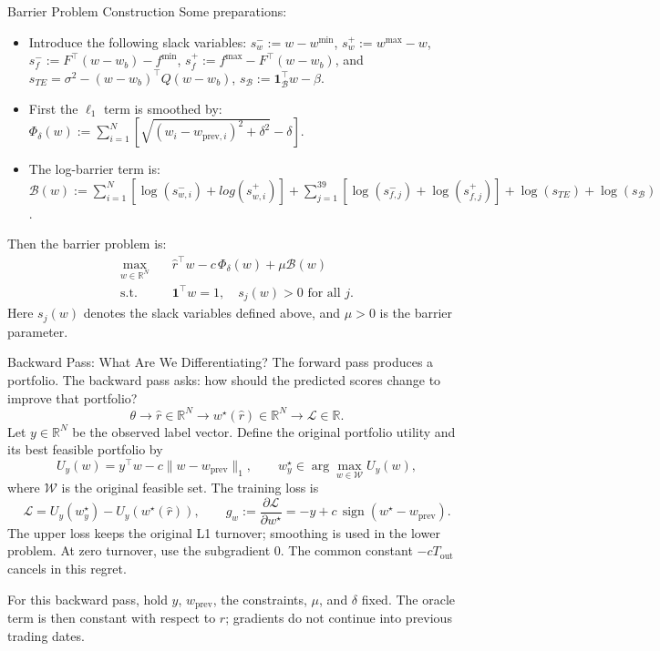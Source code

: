 \documentclass[aspectratio=169,xcolor=dvipsnames]{beamer}
\begin{document}
\begin{frame}{Barrier Problem Construction}
    Some preparations:
    \begin{itemize}
        \item Introduce the following slack variables: $s_w^- := w-w^{\min}$, $s_w^+ := w^{\max}-w$, $s_f^- := F^\top(w-w_b)-f^{\min}$, $s_f^+ := f^{\max}-F^\top(w-w_b)$, and $s_{TE} = \sigma^2-(w-w_b)^\top Q(w-w_b)$, $s_{\mathcal{B}} := \mathbf{1}_{\mathcal B}^\top w-\beta$. 
        \item First the $\ell_1$ term is smoothed by: $\Phi_{\delta}(w) := \sum_{i=1}^N \left[\sqrt{(w_i-w_{\mathrm{prev},i})^2+\delta^2}-\delta\right]$.
        \item The log-barrier term is: $\mathcal{B}(w) := \sum_{i=1}^N \left[\log(s_{w,i}^-) + log(s_{w,i}^+)\right] + \sum_{j=1}^{39} \left[\log(s_{f,j}^-) + \log(s_{f,j}^+)\right] + \log(s_{TE}) + \log(s_{\mathcal{B}})$.
    \end{itemize}
    Then the barrier problem is:
    \begin{equation}
    \begin{aligned}
    \max_{w\in\mathbb{R}^N}\quad
    & \hat r^\top w-c\,\Phi_{\delta}(w)+\mu\mathcal{B}(w) \\[2pt]
    \text{s.t.}\quad
    & \mathbf{1}^\top w=1, \quad s_j(w) > 0 \text{ for all } j.
    \end{aligned}
    \end{equation}
    Here $s_j(w)$ denotes the slack variables defined above, and $\mu>0$ is the barrier parameter.
     
\end{frame}

\begin{frame}{Backward Pass: What Are We Differentiating?}
    \small
    The forward pass produces a portfolio. The backward pass asks:
    how should the predicted scores change to improve that portfolio?
    \[
    \theta \longrightarrow \hat r\in\mathbb{R}^N
    \longrightarrow w^\star(\hat r)\in\mathbb{R}^N
    \longrightarrow \mathcal L\in\mathbb{R}.
    \]
    Let $y\in\mathbb{R}^N$ be the observed label vector. Define the
    original portfolio utility and its best feasible portfolio by
    \[
    U_y(w)=y^\top w-c\lVert w-w_{\mathrm{prev}}\rVert_1,
    \qquad w_y^\star\in\arg\max_{w\in\mathcal W}U_y(w),
    \]
    where $\mathcal W$ is the original feasible set. The training loss is
    \[
    \mathcal L=U_y(w_y^\star)-U_y(w^\star(\hat r)),
    \qquad
    g_w:=\frac{\partial\mathcal L}{\partial w^\star}
    =-y+c\,\operatorname{sign}(w^\star-w_{\mathrm{prev}}).
    \]
    The upper loss keeps the original L1 turnover; smoothing is used in
    the lower problem. At zero turnover, use the subgradient $0$.
    The common constant $-cT_{\mathrm{out}}$ cancels in this regret.
    \medskip

    For this backward pass, hold $y$, $w_{\mathrm{prev}}$, the constraints,
    $\mu$, and $\delta$ fixed. The oracle term is then constant with respect
    to $\hat r$; gradients do not continue into previous trading dates.
\end{frame}
\end{document}
